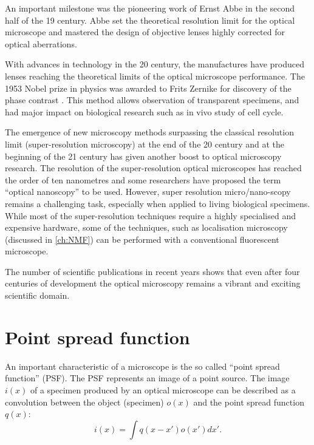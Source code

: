 An important milestone was the pioneering work of Ernst Abbe \cite{Abbe1873} in the second half of the 19\ths{} century. Abbe set the theoretical resolution limit for the optical microscope and mastered the design of objective lenses highly corrected for optical aberrations.

With advances in technology in the 20\ths{} century, the manufactures have produced lenses reaching the theoretical limits of the optical microscope performance. The 1953 Nobel prize in physics was awarded to Frits Zernike for discovery of the phase contrast \cite{Zernike1942}. This method allows observation of transparent specimens, and had major impact on biological research such as in vivo study of cell cycle. 

The emergence of new microscopy methods surpassing the classical resolution limit (super-resolution microscopy) at the end of the 20\ths{} century and at the beginning of the 21\st{} century has given another boost to optical microscopy research. The resolution of the super-resolution optical microscopes has reached the order of ten nanometres and some researchers have proposed the term ``optical nanoscopy'' to be used. However, super resolution micro/nano-scopy remains a challenging task, especially when applied to living biological specimens. While most of the super-resolution techniques require a highly specialised and expensive hardware, some of the techniques, such as localisation microscopy (discussed in \autoref{ch:NMF}) can be performed with a conventional fluorescent microscope. 

The number of scientific publications in recent years shows that even after four centuries of development the optical microscopy remains a vibrant and exciting scientific domain.


\section{Point spread function}

An important characteristic of a microscope is the so called ``point spread function'' (PSF). The PSF represents an image of a point source. The image $i(x)$ of a specimen produced by an optical microscope can be described as a convolution between the object (specimen) $o(x)$ and the point spread function $q(x)$:
%
\begin{equation}
	i(x)=\int q(x-x')o(x')dx'.
	\label{eq:conv}
\end{equation}  

